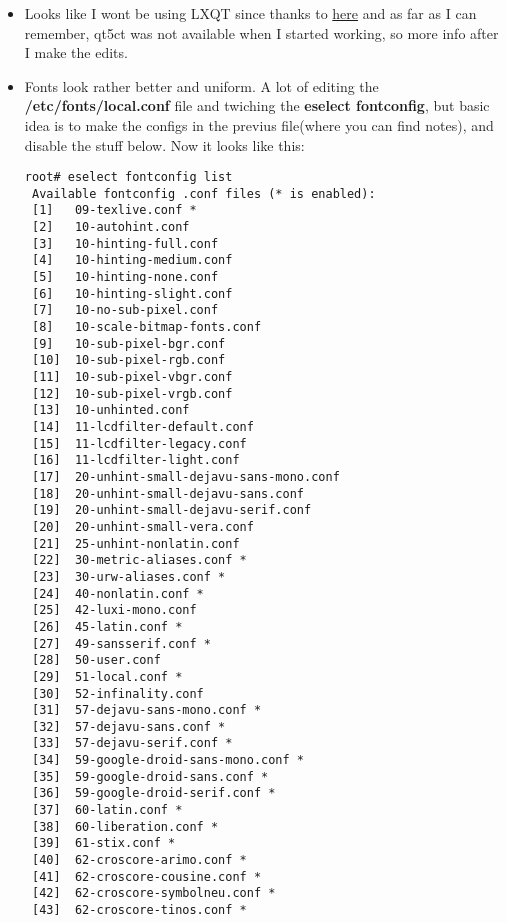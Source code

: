 \documentclass[11pt,a4paper]{article}
\begin{document}
            \begin{itemize}
                \item Looks like I wont be using LXQT since thanks to \href{https://github.com/manjaro/release-plan/issues/73}{here} and as far as I can remember, qt5ct was not available when I started working, so more info after I make the edits.
                \item Fonts look rather better and uniform. A lot of editing the \textbf{/etc/fonts/local.conf} file and twiching the \textbf{eselect fontconfig}, but basic idea is to make the configs in the previus file(where you can find notes), and disable the stuff below. Now it looks like this:
                
                \begin{lstlisting}[style=BashInputRoot]
 root# eselect fontconfig list 
 Available fontconfig .conf files (* is enabled):
 [1]   09-texlive.conf *
 [2]   10-autohint.conf
 [3]   10-hinting-full.conf
 [4]   10-hinting-medium.conf
 [5]   10-hinting-none.conf
 [6]   10-hinting-slight.conf
 [7]   10-no-sub-pixel.conf
 [8]   10-scale-bitmap-fonts.conf
 [9]   10-sub-pixel-bgr.conf
 [10]  10-sub-pixel-rgb.conf
 [11]  10-sub-pixel-vbgr.conf
 [12]  10-sub-pixel-vrgb.conf
 [13]  10-unhinted.conf
 [14]  11-lcdfilter-default.conf
 [15]  11-lcdfilter-legacy.conf
 [16]  11-lcdfilter-light.conf
 [17]  20-unhint-small-dejavu-sans-mono.conf
 [18]  20-unhint-small-dejavu-sans.conf
 [19]  20-unhint-small-dejavu-serif.conf
 [20]  20-unhint-small-vera.conf
 [21]  25-unhint-nonlatin.conf
 [22]  30-metric-aliases.conf *
 [23]  30-urw-aliases.conf *
 [24]  40-nonlatin.conf *
 [25]  42-luxi-mono.conf
 [26]  45-latin.conf *
 [27]  49-sansserif.conf *
 [28]  50-user.conf
 [29]  51-local.conf *
 [30]  52-infinality.conf
 [31]  57-dejavu-sans-mono.conf *
 [32]  57-dejavu-sans.conf *
 [33]  57-dejavu-serif.conf *
 [34]  59-google-droid-sans-mono.conf *
 [35]  59-google-droid-sans.conf *
 [36]  59-google-droid-serif.conf *
 [37]  60-latin.conf *
 [38]  60-liberation.conf *                                                                  
 [39]  61-stix.conf *                                                                        
 [40]  62-croscore-arimo.conf *                                                              
 [41]  62-croscore-cousine.conf *                                                            
 [42]  62-croscore-symbolneu.conf *                                                          
 [43]  62-croscore-tinos.conf *                                                                   

\end{lstlisting}
\end{itemize}
\end{document}
